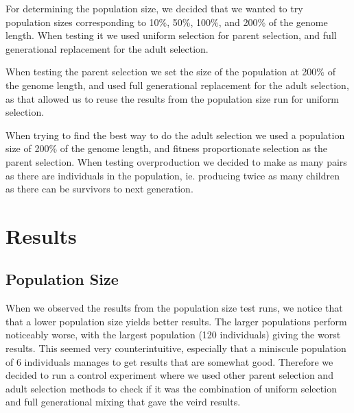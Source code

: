 For determining the population size, we decided that we wanted to try population sizes corresponding to 10\%, 50\%, 100\%, and 200\% of the genome length. When testing it we used uniform selection for parent selection, and full generational replacement for the adult selection.

When testing the parent selection we set the size of the population at 200\% of the genome length, and used full generational replacement for the adult selection, as that allowed us to reuse the results from the population size run for uniform selection.

When trying to find the best way to do the adult selection we used a population size of 200\% of the genome length, and fitness proportionate selection as the parent selection. When testing overproduction we decided to make as many pairs as there are individuals in the population, ie. producing twice as many children as there can be survivors to next generation.

\clearpage

\section{Results} %
\label{sec:results}

\subsection{Population Size} %
\label{sub:population_size}

When we observed the results from the population size test runs, we notice that that a lower population size yields better results. The larger populations perform noticeably worse, with the largest population (120 individuals) giving the worst results. This seemed very counterintuitive, especially that a miniscule population of 6 individuals manages to get results that are somewhat good. Therefore we decided to run a control experiment where we used other parent selection and adult selection methods to check if it was the combination of uniform selection and full generational mixing that gave the veird results.

